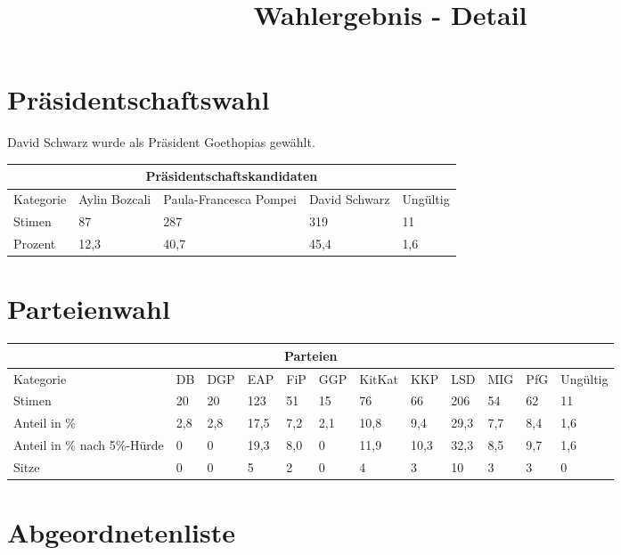 \documentclass{sasbase}
\begin{document}
\onecolumn
\title{Wahlergebnis - Detail}

\mytitle

\setlength{\parindent}{0mm}
\setlength{\parskip}{2mm}

\section{Präsidentschaftswahl}

David Schwarz wurde als Präsident Goethopias gewählt.

\begin{tabular}{ |p{3cm}||p{3cm}|p{3cm}|p{3cm}|p{3cm}|  }
 \hline
 \multicolumn{5}{|c|}{Präsidentschaftskandidaten} \\
 \hline
 Kategorie & Aylin Bozcali  & Paula-Francesca Pompei & David Schwarz & Ungültig\\
 \hline
 Stimen   & 87    & 287 &   319 & 11 \\
 Prozent &  12,3  & 40,7   & 45,4 & 1,6 \\
 \hline
\end{tabular}



\section{Parteienwahl}

\begin{tabular}{ |p{3cm}||p{1cm}|p{1cm}|p{1cm}|p{1cm}|p{1cm}|p{1cm}|p{1cm}|p{1cm}|p{1cm}|p{1cm}|p{1.2cm}|  }
 \hline
 \multicolumn{12}{|c|}{Parteien} \\
 \hline
 Kategorie & DB & DGP & EAP & FiP & GGP & KitKat & KKP & LSD & MIG & PfG & Ungültig\\
 \hline
 Stimen   & 20 & 20  & 123 & 51 & 15 & 76 & 66 & 206 & 54 & 62 & 11 \\
 Anteil in \%  & 2,8 & 2,8  & 17,5 & 7,2 & 2,1 & 10,8 & 9,4 & 29,3 & 7,7 & 8,4 & 1,6 \\
 Anteil in \% nach 5\%-Hürde  & 0 & 0 & 19,3  & 8,0 & 0 & 11,9 & 10,3 & 32,3 & 8,5 & 9,7 & 1,6 \\
 Sitze & 0 & 0 & 5 & 2 & 0 & 4 & 3 & 10 & 3 & 3 & 0\\
 \hline
\end{tabular}

\section{Abgeordnetenliste}
\end{document}
